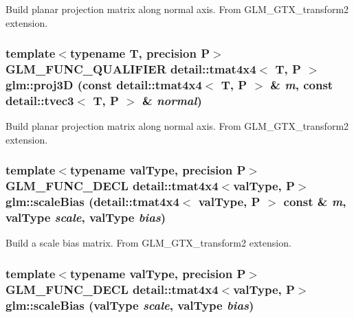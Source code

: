 Build planar projection matrix along normal axis. From GLM\_\-GTX\_\-transform2 extension. \hypertarget{group__gtx__transform2_gea404ce6c1541825232f418242bff9fb}{
\subsubsection[proj3D]{\setlength{\rightskip}{0pt plus 5cm}template$<$typename T, precision P$>$ GLM\_\-FUNC\_\-QUALIFIER detail::tmat4x4$<$ T, P $>$ glm::proj3D (const detail::tmat4x4$<$ T, P $>$ \& {\em m}, \/  const detail::tvec3$<$ T, P $>$ \& {\em normal})}}
\label{group__gtx__transform2_gea404ce6c1541825232f418242bff9fb}


Build planar projection matrix along normal axis. From GLM\_\-GTX\_\-transform2 extension. \hypertarget{group__gtx__transform2_g235e65153daa1bdc12fcc07c8019931b}{
\subsubsection[scaleBias]{\setlength{\rightskip}{0pt plus 5cm}template$<$typename valType, precision P$>$ GLM\_\-FUNC\_\-DECL detail::tmat4x4$<$valType, P$>$ glm::scaleBias (detail::tmat4x4$<$ valType, P $>$ const \& {\em m}, \/  valType {\em scale}, \/  valType {\em bias})}}
\label{group__gtx__transform2_g235e65153daa1bdc12fcc07c8019931b}


Build a scale bias matrix. From GLM\_\-GTX\_\-transform2 extension. \hypertarget{group__gtx__transform2_gd75c85daca353804c161589fe32ce107}{
\subsubsection[scaleBias]{\setlength{\rightskip}{0pt plus 5cm}template$<$typename valType, precision P$>$ GLM\_\-FUNC\_\-DECL detail::tmat4x4$<$valType, P$>$ glm::scaleBias (valType {\em scale}, \/  valType {\em bias})}}
\label{group__gtx__transform2_gd75c85daca353804c161589fe32ce107}



